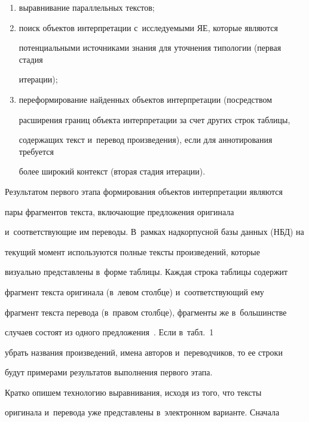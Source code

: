   \begin{enumerate}[(1)]


  \item  выравнивание параллельных текстов;


  \item поиск объектов интерпретации с~исследуемыми ЯЕ, которые являются 


потенциальными источниками знания для уточнения типологии (первая стадия 


итерации);


  \item переформирование найденных объектов интерпретации (посредством 


расширения границ объекта интерпретации за счет других строк таблицы, 


содержащих текст и~перевод произведения), если для аннотирования требуется 


более широкий контекст (вторая стадия итерации).


  \end{enumerate}


  


  Результатом первого этапа формирования объектов интерпретации являются 


пары фрагментов текста, включающие предложения оригинала 


и~соответствующие им переводы. В~рамках надкорпусной базы данных (НБД) на 


текущий момент используются полные тексты произведений, которые 


визуально представлены в~форме таблицы. Каждая строка таблицы содержит 


фрагмент текста оригинала (в~левом столбце) и~соответствующий ему 


фрагмент текста перевода (в~правом столбце), фрагменты же в~большинстве 


случаев состоят из одного предложения~\cite{9-gz, 10-gz}. Если в~табл.~1 


убрать названия произведений, имена авторов и~переводчиков, то ее строки 


будут примерами результатов выполнения первого этапа.


  


  Кратко опишем технологию выравнивания, исходя из того, что тексты 


оригинала и~перевода уже представлены в~электронном варианте. Сначала 


